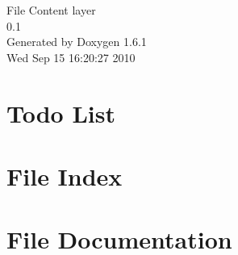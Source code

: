\documentclass[a4paper]{book}
\begin{document}
\begin{titlepage}
\vspace*{7cm}
\begin{center}
{\Large File Content layer \\[1ex]\large 0.1 }\\
\vspace*{1cm}
{\large Generated by Doxygen 1.6.1}\\
\vspace*{0.5cm}
{\small Wed Sep 15 16:20:27 2010}\\
\end{center}
\end{titlepage}
\clearemptydoublepage
{}
\tableofcontents
\clearemptydoublepage
{}
\chapter{Todo List}
\label{todo}

\chapter{File Index}

\chapter{File Documentation}











\printindex
\end{document}
